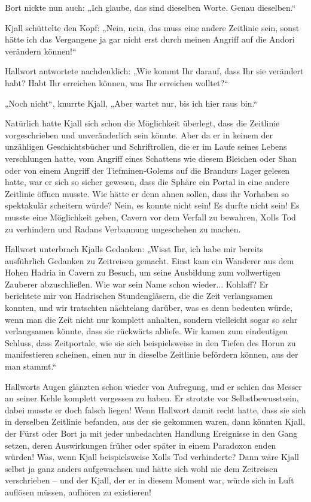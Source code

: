Bort nickte nun auch: „Ich glaube, das sind dieselben Worte. Genau dieselben.“

Kjall schüttelte den Kopf: „Nein, nein, das muss eine andere Zeitlinie sein, sonst hätte ich das Vergangene ja gar nicht erst durch meinen Angriff auf die Andori verändern können!“

Hallwort antwortete nachdenklich: „Wie kommt Ihr darauf, dass Ihr sie verändert habt? Habt Ihr erreichen können, was Ihr erreichen wolltet?“

„Noch nicht“, knurrte Kjall, „Aber wartet nur, bis ich hier raus bin.“

Natürlich hatte Kjall sich schon die Möglichkeit überlegt, dass die Zeitlinie vorgeschrieben und unveränderlich sein könnte. Aber da er in keinem der unzähligen Geschichtsbücher und Schriftrollen, die er im Laufe seines Lebens verschlungen hatte, vom Angriff eines Schattens wie diesem Bleichen oder Shan oder von einem Angriff der Tiefminen-Golems auf die Brandurs Lager gelesen hatte, war er sich so sicher gewesen, dass die Sphäre ein Portal in eine andere Zeitlinie öffnen musste. Wie hätte er denn ahnen sollen, dass ihr Vorhaben so spektakulär scheitern würde? Nein, es konnte nicht sein! Es durfte nicht sein! Es musste eine Möglichkeit geben, Cavern vor dem Verfall zu bewahren, Xolls Tod zu verhindern und Radans Verbannung ungeschehen zu machen.

Hallwort unterbrach Kjalls Gedanken: „Wisst Ihr, ich habe mir bereits ausführlich Gedanken zu Zeitreisen gemacht. Einst kam ein Wanderer aus dem Hohen Hadria in Cavern zu Besuch, um seine Ausbildung zum vollwertigen Zauberer abzuschließen. Wie war sein Name schon wieder... Kohlaff? Er berichtete mir von Hadrischen Stundengläsern, die die Zeit verlangsamen konnten, und wir tratschten nächtelang darüber, was es denn bedeuten würde, wenn man die Zeit nicht nur komplett anhalten, sondern vielleicht sogar so sehr verlangsamen könnte, dass sie rückwärts abliefe. Wir kamen zum eindeutigen Schluss, dass Zeitportale, wie sie sich beispielsweise in den Tiefen des Horun zu manifestieren scheinen, einen nur in dieselbe Zeitlinie befördern können, aus der man stammt.“

Hallworts Augen glänzten schon wieder von Aufregung, und er schien das Messer an seiner Kehle komplett vergessen zu haben. Er strotzte vor Selbstbewusstsein, dabei musste er doch falsch liegen! Wenn Hallwort damit recht hatte, dass sie sich in derselben Zeitlinie befanden, aus der sie gekommen waren, dann könnten Kjall, der Fürst oder Bort ja mit jeder unbedachten Handlung Ereignisse in den Gang setzen, deren Auswirkungen früher oder später in einem Paradoxon enden würden! Was, wenn Kjall beispielsweise Xolls Tod verhinderte? Dann wäre Kjall selbst ja ganz anders aufgewachsen und hätte sich wohl nie dem Zeitreisen verschrieben – und der Kjall, der er in diesem Moment war, würde sich in Luft auflösen müssen, aufhören zu existieren!

